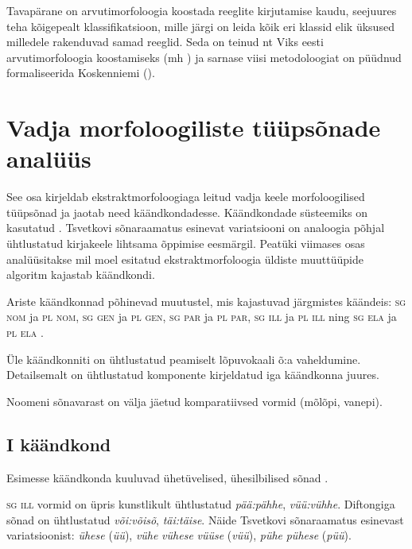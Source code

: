 \documentclass[12pt,a4paper]{article}
\newcommand{\vadja}[1]{\textit{#1}}
\newcommand{\msd}[1]{\textsc{#1}}
\begin{document}
Tavapärane on arvutimorfoloogia koostada reeglite kirjutamise kaudu, seejuures teha kõigepealt klassifikatsioon, mille järgi on leida kõik eri klassid elik üksused milledele rakenduvad samad reeglid.
Seda on teinud nt Viks eesti arvutimorfoloogia koostamiseks (mh \cite{viks_verbide_1976}) ja sarnase viisi metodoloogiat on püüdnud formaliseerida Koskenniemi (\cite{koskenniemi_informal_2013}).



\newpage
\section{Vadja morfoloogiliste tüüpsõnade analüüs}
\label{sec:analüüs}

See osa kirjeldab ekstraktmorfoloogiaga leitud vadja keele morfoloogilised tüüpsõnad ja jaotab need käändkondadesse. Käändkondade süsteemiks on kasutatud \cite{ariste_grammar_1968}. Tsvetkovi sõnaraamatus esinevat variatsiooni on analoogia põhjal ühtlustatud kirjakeele lihtsama õppimise eesmärgil. Peatüki viimases osas analüüsitakse mil moel \cite{silfverberg_computational_2018} esitatud ekstraktmorfoloogia üldiste muuttüüpide algoritm kajastab käändkondi.

Ariste käändkonnad põhinevad muutustel, mis kajastuvad järgmistes käändeis: \msd{sg nom} ja \msd{pl nom}, \msd{sg gen} ja \msd{pl gen}, \msd{sg par} ja \msd{pl par}, \msd{sg ill} ja \msd{pl ill} ning \msd{sg ela} ja \msd{pl ela} \cite[42]{ariste_grammar_1968}.

Üle käändkonniti on ühtlustatud peamiselt lõpuvokaali õ:a vaheldumine. Detailsemalt on ühtlustatud komponente kirjeldatud iga käändkonna juures.

Noomeni sõnavarast on välja jäetud komparatiivsed vormid (mõlõpi, vanepi). 

\subsection{\RN{1} käändkond}

Esimesse käändkonda kuuluvad ühetüvelised, ühesilbilised sõnad \cite[40]{ariste_grammar_1968}.

\msd{sg ill} vormid on üpris kunstlikult ühtlustatud \textit{pää:pähhe}, \textit{vüü:vühhe}. Diftongiga sõnad on ühtlustatud \textit{või:võisõ}, \textit{täi:täise}. Näide Tsvetkovi sõnaraamatus esinevast variatsioonist: \vadja{ühese} (\vadja{üü}), \vadja{vühe} \texttildelow \vadja{vühese} \texttildelow \vadja{vüüse} (\vadja{vüü}), \vadja{pühe} \texttildelow \vadja{pühese} (\vadja{püü}).
\end{document}
